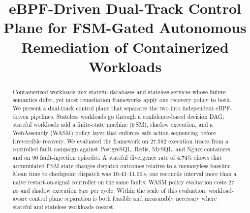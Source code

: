 \documentclass[conference]{IEEEtran}
\begin{document}
\title{eBPF-Driven Dual-Track Control Plane for FSM-Gated Autonomous Remediation of Containerized Workloads}

\author{%
\and
{}
\and
{}
}

\maketitle

\begin{abstract}
Containerized workloads mix stateful databases and stateless services whose failure semantics differ, yet most remediation frameworks apply one recovery policy to both. We present a dual-track control plane that separates the two into independent eBPF-driven pipelines. Stateless workloads go through a confidence-based decision DAG; stateful workloads add a finite-state machine (FSM), shadow execution, and a WebAssembly (WASM) policy layer that enforces safe action sequencing before irreversible recovery. We evaluated the framework on 27,592 execution traces from a controlled fault campaign against PostgreSQL, Redis, MySQL, and Nginx containers, and on 90 fault-injection episodes. A stateful divergence rate of 4.74\% shows that accumulated FSM state changes dispatch outcomes relative to a memoryless baseline. Mean time to checkpoint dispatch was 10.43--11.66\,s, one reconcile interval more than a naive restart-on-signal controller on the same faults; WASM policy evaluation costs 27\,$\mu$s and shadow execution 8\,$\mu$s per cycle. Within the scale of this evaluation, workload-aware control plane separation is both feasible and measurably necessary where stateful and stateless workloads coexist.
\end{abstract}
\end{document}
